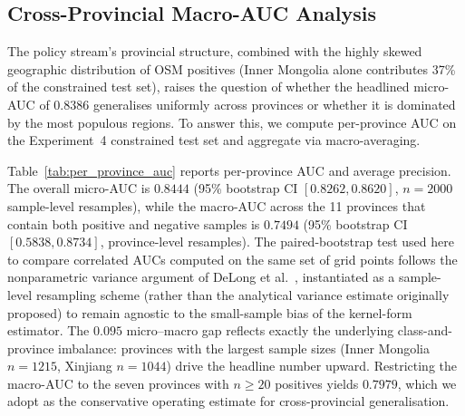 \documentclass[12pt, a4paper]{article}
\begin{document}
\subsection{Cross-Provincial Macro-AUC Analysis}
\label{sec:macro_auc}

The policy stream's provincial structure, combined with the
highly skewed geographic distribution of OSM positives (Inner
Mongolia alone contributes 37\% of the constrained test set),
raises the question of whether the headlined micro-AUC of
$0.8386$ generalises uniformly across provinces or whether it
is dominated by the most populous regions. To answer this, we
compute per-province AUC on the Experiment~4 constrained test
set and aggregate via macro-averaging.

Table~\ref{tab:per_province_auc} reports per-province AUC and
average precision. The overall micro-AUC is $0.8444$ (95\%
bootstrap CI $[0.8262, 0.8620]$, $n=2000$ sample-level
resamples), while the macro-AUC across the 11 provinces that
contain both positive and negative samples is $0.7494$
(95\% bootstrap CI $[0.5838, 0.8734]$, province-level
resamples). The paired-bootstrap test used here to compare
correlated AUCs computed on the same set of grid points
follows the nonparametric variance argument of
DeLong et al.~\cite{delong1988}, instantiated as a
sample-level resampling scheme (rather than the analytical
variance estimate originally proposed) to remain agnostic
to the small-sample bias of the kernel-form estimator.
The $0.095$ micro--macro gap reflects exactly the
underlying class-and-province imbalance: provinces with the
largest sample sizes (Inner Mongolia $n=1215$, Xinjiang
$n=1044$) drive the headline number upward. Restricting the
macro-AUC to the seven provinces with $n\geq 20$ positives
yields $0.7979$, which we adopt as the conservative operating
estimate for cross-provincial generalisation.
\end{document}
